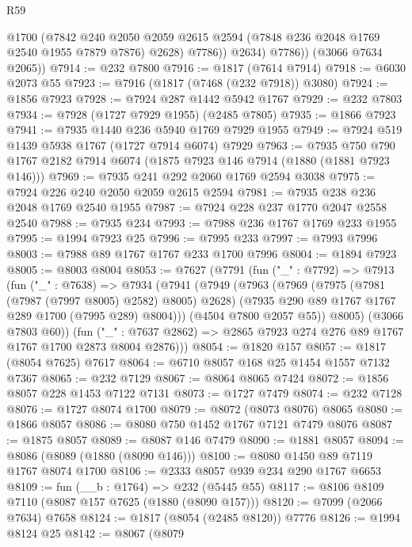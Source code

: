 \begin{lexlean}{R59}
\begin{coremodule}
                @1700
                (@7842
                  @240
                  @2050
                  @2059
                  @2615
                  @2594
                  (@7848 @236 @2048 @1769 @2540 @1955 @7879 @7876)
                  @2628)
                @7786))
            @2634)
          @7786))
      (@3066 @7634 @2065))
@7914 := @232 @7800
@7916 := @1817 (@7614 @7914)
@7918 := @6030 @2073 @55
@7923 := @7916 (@1817 (@7468 (@232 @7918)) @3080)
@7924 := @1856 @7923
@7928 := @7924 @287 @1442 @5942 @1767
@7929 := @232 @7803
@7934 := @7928 (@1727 @7929 @1955) (@2485 @7805)
@7935 := @1866 @7923
@7941 := @7935 @1440 @236 @5940 @1769 @7929 @1955
@7949 := @7924 @519 @1439 @5938 @1767 (@1727 @7914 @6074) @7929
@7963 := @7935 @750 @790 @1767 @2182 @7914 @6074 (@1875 @7923 @146 @7914 (@1880 (@1881 @7923 @146)))
@7969 := @7935 @241 @292 @2060 @1769 @2594 @3038
@7975 := @7924 @226 @240 @2050 @2059 @2615 @2594
@7981 := @7935 @238 @236 @2048 @1769 @2540 @1955
@7987 := @7924 @228 @237 @1770 @2047 @2558 @2540
@7988 := @7935 @234
@7993 := @7988 @236 @1767 @1769 @233 @1955
@7995 := @1994 @7923 @25
@7996 := @7995 @233
@7997 := @7993 @7996
@8003 := @7988 @89 @1767 @1767 @233 @1700 @7996
@8004 := @1894 @7923
@8005 := @8003 @8004
@8053 := @7627
    (@7791
      (fun ("_" : @7792) =>
      @7913
        (fun ("_" : @7638) =>
        @7934
          (@7941
            (@7949
              (@7963
                (@7969
                  (@7975 (@7981 (@7987 (@7997 @8005) @2582) @8005) @2628)
                  (@7935 @290 @89 @1767 @1767 @289 @1700 (@7995 @289) @8004)))
              (@4504 @7800 @2057 @55))
            @8005)
          (@3066 @7803 @60))
        (fun ("_" : @7637 @2862) => @2865 @7923 @274 @276 @89 @1767 @1767 @1700 @2873 @8004 @2876)))
@8054 := @1820 @157
@8057 := @1817 (@8054 @7625) @7617
@8064 := @6710 @8057 @168 @25 @1454 @1557 @7132 @7367
@8065 := @232 @7129
@8067 := @8064 @8065 @7424
@8072 := @1856 @8057 @228 @1453 @7122 @7131
@8073 := @1727 @7479
@8074 := @232 @7128
@8076 := @1727 @8074 @1700
@8079 := @8072 (@8073 @8076) @8065
@8080 := @1866 @8057
@8086 := @8080 @750 @1452 @1767 @7121 @7479 @8076
@8087 := @1875 @8057
@8089 := @8087 @146 @7479
@8090 := @1881 @8057
@8094 := @8086 (@8089 (@1880 (@8090 @146)))
@8100 := @8080 @1450 @89 @7119 @1767 @8074 @1700
@8106 := @2333 @8057 @939 @234 @290 @1767 @6653
@8109 := fun (__b : @1764) => @232 (@5445 @55)
@8117 := @8106 @8109 @7110 (@8087 @157 @7625 (@1880 (@8090 @157)))
@8120 := @7099 (@2066 @7634) @7658
@8124 := @1817 (@8054 (@2485 @8120)) @7776
@8126 := @1994 @8124 @25
@8142 := @8067
    (@8079

\end{coremodule}
\end{lexlean}
